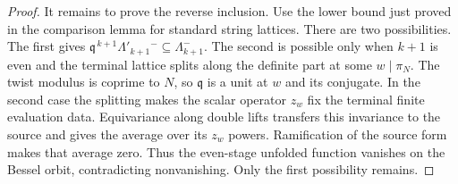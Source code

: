 \begin{proof}
It remains to prove the reverse inclusion. Use the lower bound just proved in the comparison lemma for standard string lattices. There are two possibilities. The first gives $\mathfrak q^{\,k+1}\Lambda'_{k+1}{}^{-}\subseteq\Lambda_{k+1}^{-}$. The second is possible only when $k+1$ is even and the terminal lattice splits along the definite part at some $w\mid\pi_N$. The twist modulus is coprime to $N$, so $\mathfrak q$ is a unit at $w$ and its conjugate. In the second case the splitting makes the scalar operator $z_w$ fix the terminal finite evaluation data. Equivariance along double lifts transfers this invariance to the source and gives the average over its $z_w$ powers. Ramification of the source form makes that average zero. Thus the even-stage unfolded function vanishes on the Bessel orbit, contradicting nonvanishing. Only the first possibility remains.
\end{proof}

